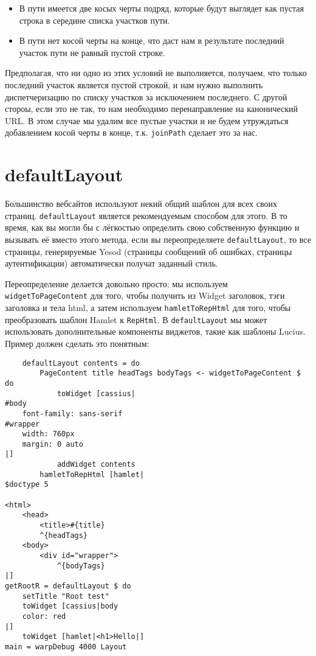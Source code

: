 \begin{itemize}
  \item В пути имеется две косых черты подряд, которые будут выглядет как пустая строка в середине списка участков пути.
  \item В пути нет косой черты на конце, что даст нам в результате последний участок пути не равный пустой строке.
\end{itemize}

Предполагая, что ни одно из этих условий не выполняется, получаем, что только последний участок является пустой строкой, и нам нужно выполнить диспетчеризацию по списку участков за исключением последнего. С другой стороы, если это не так, то нам необходимо перенаправление на канонический URL. В этом случае мы удалим все пустые участки и не будем утруждаться добавлением косой черты в конце, т.к. \lstinline!joinPath! сделает это за нас.

\section {defaultLayout}

Большинство вебсайтов используют некий общий шаблон для всех своих страниц. \lstinline!defaultLayout! является рекомендуемым способом для этого. В то время, как вы могли бы с лёгкостью определить свою собственную функцию и вызывать её вместо этого метода, если вы переопределяете \lstinline!defaultLayout!, то все страницы, генерируемые Yesod (страницы сообщений об ошибках, страницы аутентификации) автоматически получат заданный стиль.

Переопределение делается довольно просто: мы используем \lstinline!widgetToPageContent! для того, чтобы получить из Widget заголовок, тэги заголовка и тела html, а затем используем \lstinline!hamletToRepHtml! для того, чтобы преобразовать шаблон Hamlet к \lstinline!RepHtml!. В \lstinline!defaultLayout! мы может использовать дополнительные компоненты виджетов, такие как шаблоны Lucius. Пример должен сделать это понятным:

\begin{lstlisting}
    defaultLayout contents = do
        PageContent title headTags bodyTags <- widgetToPageContent $ do
            toWidget [cassius|
#body
    font-family: sans-serif
#wrapper
    width: 760px
    margin: 0 auto
|]
            addWidget contents
        hamletToRepHtml [hamlet|
$doctype 5

<html>
    <head>
        <title>#{title}
        ^{headTags}
    <body>
        <div id="wrapper">
            ^{bodyTags}
|]
getRootR = defaultLayout $ do
    setTitle "Root test"
    toWidget [cassius|body
    color: red
|]
    toWidget [hamlet|<h1>Hello|]
main = warpDebug 4000 Layout
\end{lstlisting}%

